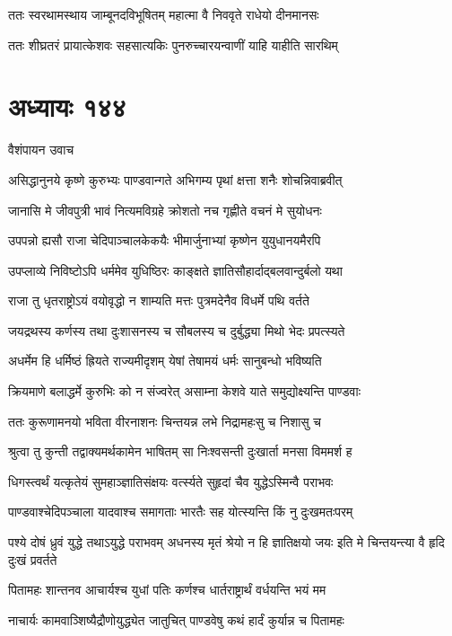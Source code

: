 \twolineshloka
{ततः स्वरथामस्थाय जाम्बूनदविभूषितम्}
{महात्मा वै निववृते राधेयो दीनमानसः}


\twolineshloka
{ततः शीघ्रतरं प्रायात्केशवः सहसात्यकिः}
{पुनरुच्चारयन्वाणीं याहि याहीति सारथिम्}


\chapter{अध्यायः १४४}
\twolineshloka
{वैशंपायन उवाच}
{}


\twolineshloka
{असिद्धानुनये कृष्णे कुरुभ्यः पाण्डवान्गते}
{अभिगम्य पृथां क्षत्ता शनैः शोचन्निवाब्रवीत्}


\twolineshloka
{जानासि मे जीवपुत्री भावं नित्यमविग्रहे}
{क्रोशतो नच गृह्णीते वचनं मे सुयोधनः}


\twolineshloka
{उपपन्नो ह्यसौ राजा चेदिपाञ्चालकेकयैः}
{भीमार्जुनाभ्यां कृष्णेन युयुधानयमैरपि}


\twolineshloka
{उपप्लाव्ये निविष्टोऽपि धर्ममेव युधिष्ठिरः}
{काङ्क्षते ज्ञातिसौहार्दाद्बलवान्दुर्बलो यथा}


\twolineshloka
{राजा तु धृतराष्ट्रोऽयं वयोवृद्धो न शाम्यति}
{मत्तः पुत्रमदेनैव विधर्मे पथि वर्तते}


\threelineshloka
{जयद्रथस्य कर्णस्य तथा दुःशासनस्य च}
{सौबलस्य च दुर्बुद्ध्या मिथो भेदः प्रपत्स्यते}
{}


\twolineshloka
{अधर्मेम हि धर्मिष्ठं ह्रियते राज्यमीदृशम्}
{येषां तेषामयं धर्मः सानुबन्धो भविष्यति}


\twolineshloka
{क्रियमाणे बलाद्धर्मे कुरुभिः को न संज्वरेत्}
{असाम्ना केशवे याते समुद्योक्ष्यन्ति पाण्डवाः}


\twolineshloka
{ततः कुरूणामनयो भविता वीरनाशनः}
{चिन्तयन्न लभे निद्रामहःसु च निशासु च}


\twolineshloka
{श्रुत्वा तु कुन्ती तद्वाक्यमर्थकामेन भाषितम्}
{सा निःश्वसन्ती दुःखार्ता मनसा विममर्श ह}


\twolineshloka
{धिगस्त्वर्थं यत्कृतेयं सुमहाञ्ज्ञातिसंक्षयः}
{वर्त्स्यते सुहृदां चैव युद्धेऽस्मिन्वै पराभवः}


\twolineshloka
{पाण्डवाश्चेदिपञ्चाला यादवाश्च समागताः}
{भारतैः सह योत्स्यन्ति किं नु दुःखमतःपरम्}


\threelineshloka
{पश्ये दोषं ध्रुवं युद्धे तथाऽयुद्धे पराभवम्}
{अधनस्य मृतं श्रेयो न हि ज्ञातिक्षयो जयः}
{इति मे चिन्तयन्त्या वै हृदि दुःखं प्रवर्तते}


\twolineshloka
{पितामहः शान्तनव आचार्यश्च युधां पतिः}
{कर्णश्च धार्तराष्ट्रार्थं वर्धयन्ति भयं मम}


\threelineshloka
{नाचार्यः कामवाञ्शिष्यैद्रौणोयुद्ध्येत जातुचित्}
{पाण्डवेषु कथं हार्दं कुर्यान्न च पितामहः}
{}


